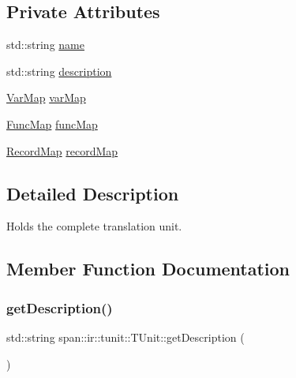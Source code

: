 \subsection*{Private Attributes}
\begin{DoxyCompactItemize}
\item 
std\+::string \hyperlink{classspan_1_1ir_1_1tunit_1_1TUnit_a85bc904e0f35d0548988e0b8b0cffa0c}{name}
\item 
std\+::string \hyperlink{classspan_1_1ir_1_1tunit_1_1TUnit_a234d89befc589b46e7227e67738c023f}{description}
\item 
\hyperlink{namespacespan_1_1ir_1_1tunit_ab87decca6ee3f2091cb24b47d831aa44}{Var\+Map} \hyperlink{classspan_1_1ir_1_1tunit_1_1TUnit_a9e94f144516f56f7a28a62e4da5e56dc}{var\+Map}
\item 
\hyperlink{namespacespan_1_1ir_1_1tunit_a8c9ac0f8660f3f103f7b1ecb106b583b}{Func\+Map} \hyperlink{classspan_1_1ir_1_1tunit_1_1TUnit_a77da7dda7442e2e3f60128ff2fd3c7ed}{func\+Map}
\item 
\hyperlink{namespacespan_1_1ir_1_1tunit_a466edb24fa3caa23d32ca7bc2cdeac12}{Record\+Map} \hyperlink{classspan_1_1ir_1_1tunit_1_1TUnit_ac1c89020cf1138a326821d2d61bf9ebe}{record\+Map}
\end{DoxyCompactItemize}


\subsection{Detailed Description}
Holds the complete translation unit. 

\subsection{Member Function Documentation}
\mbox{\label{classspan_1_1ir_1_1tunit_1_1TUnit_ae80082eafb1c5ab45732473730d681a8}} 
\subsubsection{\texorpdfstring{get\+Description()}{getDescription()}}
{\footnotesize\ttfamily std\+::string span\+::ir\+::tunit\+::\+T\+Unit\+::get\+Description (\begin{DoxyParamCaption}{ }\end{DoxyParamCaption})}




